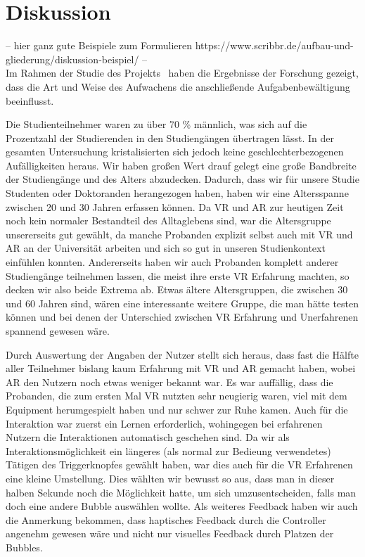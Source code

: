 \chapter{Diskussion}
-- hier ganz gute Beispiele zum Formulieren https://www.scribbr.de/aufbau-und-gliederung/diskussion-beispiel/
--\\

Im Rahmen der Studie des Projekts \projectName \, haben die Ergebnisse der Forschung gezeigt, dass die Art und Weise des Aufwachens die anschließende Aufgabenbewältigung beeinflusst.

Die Studienteilnehmer waren zu über 70 \% männlich, was sich auf die Prozentzahl der Studierenden in den Studiengängen übertragen lässt. In der gesamten Untersuchung kristalisierten sich jedoch keine geschlechterbezogenen Aufälligkeiten heraus.
Wir haben großen Wert drauf gelegt eine große Bandbreite der Studiengänge und des Alters abzudecken. Dadurch, dass wir für unsere Studie Studenten oder Doktoranden herangezogen haben, haben wir eine Altersspanne zwischen 20 und 30 Jahren erfassen können. Da VR und AR zur heutigen Zeit noch kein normaler Bestandteil des Alltaglebens sind, war die Altersgruppe unsererseits gut gewählt, da manche Probanden explizit selbst auch mit VR und AR an der Universität arbeiten und sich so gut in unseren Studienkontext einfühlen konnten. Andererseits haben wir auch Probanden komplett anderer Studiengänge teilnehmen lassen, die meist ihre erste VR Erfahrung machten, so decken wir also beide Extrema ab. Etwas ältere Altersgruppen, die zwischen 30 und 60 Jahren sind, wären eine interessante weitere Gruppe, die man hätte testen können und bei denen der Unterschied zwischen VR Erfahrung und Unerfahrenen spannend gewesen wäre. 

Durch Auswertung der Angaben der Nutzer stellt sich heraus, dass fast die Hälfte aller Teilnehmer bislang kaum Erfahrung mit VR und AR gemacht haben, wobei AR den Nutzern noch etwas weniger bekannt war.
Es war auffällig, dass die Probanden, die zum ersten Mal VR nutzten sehr neugierig waren, viel mit dem Equipment herumgespielt haben und nur schwer zur Ruhe kamen. Auch für die Interaktion war zuerst ein Lernen erforderlich, wohingegen bei erfahrenen Nutzern die Interaktionen automatisch geschehen sind. Da wir als Interaktionsmöglichkeit ein längeres (als normal zur Bedieung verwendetes) Tätigen des Triggerknopfes gewählt haben, war dies auch für die VR Erfahrenen eine kleine Umstellung. Dies wählten wir bewusst so aus, dass man in dieser halben Sekunde noch die Möglichkeit hatte, um sich umzusentscheiden, falls man doch eine andere Bubble auswählen wollte. 
Als weiteres Feedback haben wir auch die Anmerkung bekommen, dass haptisches Feedback durch die Controller angenehm gewesen wäre und nicht nur visuelles Feedback durch Platzen der Bubbles.


